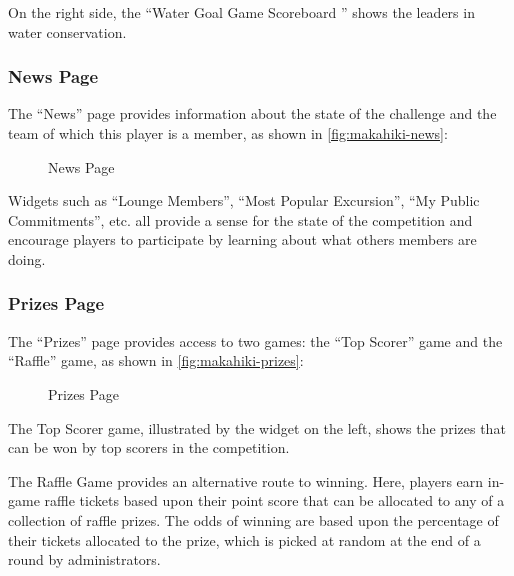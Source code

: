 On the right side, the ``Water Goal Game Scoreboard '' shows the leaders in water conservation.

\clearpage


\subsubsection{News Page}

The ``News'' page provides information about the state of the challenge and the team of which this player is a member, as shown in \autoref{fig:makahiki-news}:

\begin{figure}[!ht]
\begin{center}
\end{center}
\caption{News Page}
\label{fig:makahiki-news}
\end{figure}

Widgets such as ``Lounge Members'', ``Most Popular Excursion'', ``My Public Commitments'', etc. all provide a sense for the state of the competition and encourage players to participate by learning about what others members are doing.

\clearpage

\subsubsection{Prizes Page}

The ``Prizes'' page provides access to two games: the ``Top Scorer'' game and the ``Raffle'' game, as shown in \autoref{fig:makahiki-prizes}:

\begin{figure}[!ht]
\begin{center}
\end{center}
\caption{Prizes Page}
\label{fig:makahiki-prizes}
\end{figure}

The Top Scorer game, illustrated by the widget on the left, shows the prizes that can be won by top scorers in the competition.

The Raffle Game provides an alternative route to winning. Here, players earn in-game raffle tickets based upon their point score that can be allocated to any of a collection of raffle prizes. The odds of winning are based upon the percentage of their tickets allocated to the prize, which is picked at random at the end of a round by administrators.

